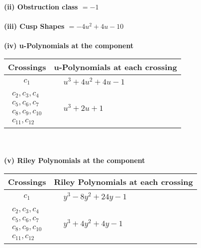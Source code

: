 \documentclass[1p]{elsarticle_modified}
\theoremstyle{definition}
\begin{document}
\flushleft \textbf{(ii) Obstruction class $= -1$}\\~\\
\flushleft \textbf{(iii) Cusp Shapes $= -4 u^2+4 u-10$}\\~\\
\newpage\renewcommand{\arraystretch}{1}
\flushleft \textbf{(iv) u-Polynomials at the component}\newline \\
\begin{tabular}{m{50pt}|m{274pt}}
Crossings & \hspace{64pt}u-Polynomials at each crossing \\
\hline $$\begin{aligned}c_{1}\end{aligned}$$&$\begin{aligned}
&u^3+4 u^2+4 u-1
\end{aligned}$\\
\hline $$\begin{aligned}c_{2},c_{3},c_{4}\\c_{5},c_{6},c_{7}\\c_{8},c_{9},c_{10}\\c_{11},c_{12}\end{aligned}$$&$\begin{aligned}
&u^3+2 u+1
\end{aligned}$\\
\hline
\end{tabular}\\~\\
\newpage\renewcommand{\arraystretch}{1}
\flushleft \textbf{(v) Riley Polynomials at the component}\newline \\
\begin{tabular}{m{50pt}|m{274pt}}
Crossings & \hspace{64pt}Riley Polynomials at each crossing \\
\hline $$\begin{aligned}c_{1}\end{aligned}$$&$\begin{aligned}
&y^3-8 y^2+24 y-1
\end{aligned}$\\
\hline $$\begin{aligned}c_{2},c_{3},c_{4}\\c_{5},c_{6},c_{7}\\c_{8},c_{9},c_{10}\\c_{11},c_{12}\end{aligned}$$&$\begin{aligned}
&y^3+4 y^2+4 y-1
\end{aligned}$\\
\hline
\end{tabular}\\~\\
\end{document}
